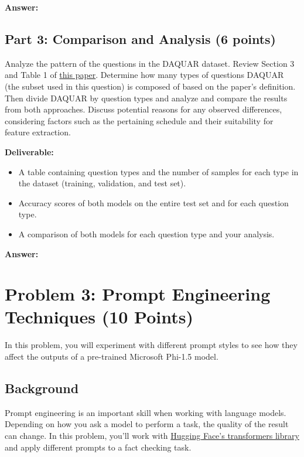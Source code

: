 \documentclass[11pt, oneside]{article}   	%
\begin{document}
\textbf{Answer:} \\

\subsection*{Part 3: Comparison and Analysis (6 points)}

Analyze the pattern of the questions in the DAQUAR dataset. Review Section 3 and Table 1 of \href{https://openaccess.thecvf.com/content_ICCV_2017/papers/Kafle_An_Analysis_of_ICCV_2017_paper.pdf}{this paper}. Determine how many types of questions DAQUAR (the subset used in this question) is composed of based on the paper's definition. Then divide DAQUAR by question types and analyze and compare the results from both approaches. Discuss potential reasons for any observed differences, considering factors such as the pertaining schedule and their suitability for feature extraction.

\noindent\textbf{Deliverable:}
\begin{itemize}
\item A table containing question types and the number of samples for each type in the dataset (training, validation, and test set).
\item Accuracy scores of both models on the entire test set and for each question type.
\item A comparison of both models for each question type and your analysis.
\end{itemize}


\textbf{Answer:} \\


 

\section*{Problem 3: Prompt Engineering Techniques (10 Points)}

In this problem, you will experiment with different prompt styles to see how they affect the outputs of a pre-trained Microsoft Phi-1.5 model.

\subsection*{Background}
Prompt engineering is an important skill when working with language models. Depending on how you ask a model to perform a task, the quality of the result can change. In this problem, you'll work with \href{https://huggingface.co/docs/transformers/main_classes/pipelines}{Hugging Face’s transformers library} and apply different prompts to a fact checking task.
\end{document}

